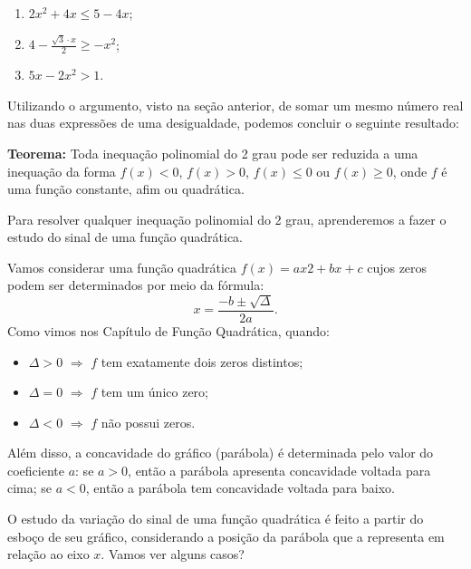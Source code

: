 \begin{enumerate}
\item{}
$2x^2 + 4x \leq 5 - 4x$;

\item{}
$4 - \frac{\sqrt{3} \cdot x}{2} \geq -x^2$;

\item{}
$5x - 2x^2 > 1$.
\end{enumerate}

Utilizando o argumento, visto na seção anterior, de somar um mesmo número real nas duas expressões de uma desigualdade, podemos concluir o seguinte resultado:
 
\begin{observation}{}
\textbf{Teorema:} Toda inequação polinomial do 2 grau pode ser reduzida a uma inequação da forma $f(x) <0$, $f(x) > 0$, $f(x) \leq 0$ ou $f(x) \geq 0$, onde $f$ é uma função constante, afim ou quadrática.

\end{observation}

Para resolver qualquer inequação polinomial do 2 grau, aprenderemos a fazer o estudo do sinal de uma função quadrática.

Vamos considerar uma função quadrática $f(x) = ax2 + bx + c$ cujos zeros podem ser determinados por meio da fórmula:
$$
x = \frac{-b \pm \sqrt{\Delta}}{2a}.
$$  
Como vimos nos Capítulo de Função Quadrática, quando:

\begin{itemize}
\item  $\Delta >0$ $\Rightarrow$ $f$ tem exatamente dois zeros distintos;

\item   $\Delta =0$ $\Rightarrow$ $f$ tem um único zero;

\item  $\Delta <0$ $\Rightarrow$ $f$ não possui zeros.
\end{itemize}

Além disso, a concavidade do gráfico (parábola) é determinada pelo valor do coeficiente $a$: se  $a>0$, então a parábola apresenta concavidade voltada para cima; se $a<0$, então a parábola tem concavidade voltada para baixo. 


O estudo da variação do sinal de uma função quadrática é feito a partir do esboço de seu gráfico, considerando a posição da parábola que a representa em relação ao eixo $x$. Vamos ver alguns casos?


